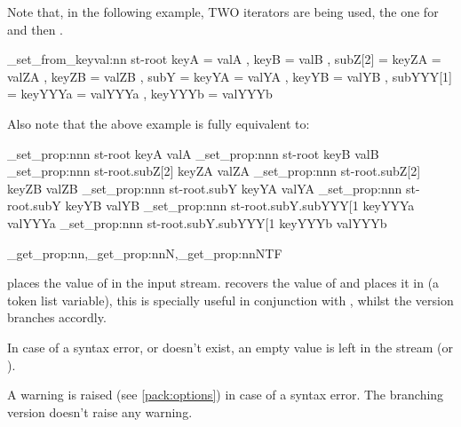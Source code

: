 \documentclass[10pt]{article}
\begin{document}
 Note that, in the following example, TWO iterators are being used, the one for  and then .

\begin{codestore}[store-env=keyval.demo8]
\starray_set_from_keyval:nn {st-root} 
  {
    keyA = valA ,
    keyB = valB ,
    subZ[2] = 
      {
        keyZA = valZA ,
        keyZB = valZB ,
      }
    subY  =
      {
        keyYA = valYA ,
        keyYB = valYB ,
        subYYY[1] =
          {
            keyYYYa = valYYYa ,
            keyYYYb = valYYYb 
          }
      }
  }  
\end{codestore}


Also note that the above example is fully equivalent to:

\begin{codestore}[store-env=keyval.demo9]
\starray_set_prop:nnn {st-root} {keyA} {valA}
\starray_set_prop:nnn {st-root} {keyB} {valB}
\starray_set_prop:nnn {st-root.subZ[2]} {keyZA} {valZA}
\starray_set_prop:nnn {st-root.subZ[2]} {keyZB} {valZB}
\starray_set_prop:nnn {st-root.subY} {keyYA} {valYA}
\starray_set_prop:nnn {st-root.subY} {keyYB} {valYB}
\starray_set_prop:nnn {st-root.subY.subYYY[1} {keyYYYa} {valYYYa}
\starray_set_prop:nnn {st-root.subY.subYYY[1} {keyYYYb} {valYYYb}
\end{codestore}


\begin{codedescribe}{\starray_get_prop:nn,\starray_get_prop:nnN,\starray_get_prop:nnNTF}
\begin{codesyntax}%
\end{codesyntax}
 places the value of  in the input stream.
 recovers the value of  and places it in  (a token list variable), this is specially useful in conjunction with , whilst the  version branches accordly.
\end{codedescribe}
\begin{tsremark}
In case of a syntax error, or  doesn't exist, an empty value is left in the stream (or ).
\end{tsremark}
\begin{tsremark}
A warning is raised (see \ref{pack:options}) in case of a  syntax error. The branching version doesn't raise any warning.
\end{tsremark}
\end{document}
